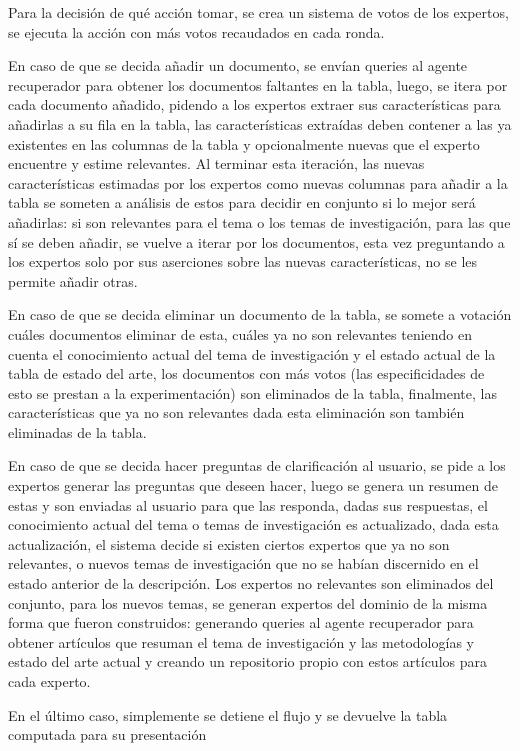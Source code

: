 \documentclass[12pt]{article}
\begin{document}
Para la decisión de qué acción tomar, se crea un sistema de votos de los expertos, se ejecuta la acción con más votos recaudados en cada ronda.

En caso de que se decida añadir un documento, se envían queries al agente recuperador para obtener los documentos faltantes en la tabla, luego, se itera por cada documento añadido, pidendo a los expertos extraer sus características para añadirlas a su fila en la tabla, las características extraídas deben contener a las ya existentes en las columnas de la tabla y opcionalmente nuevas que el experto encuentre y estime relevantes. Al terminar esta iteración, las nuevas características estimadas por los expertos como nuevas columnas para añadir a la tabla se someten a análisis de estos para decidir en conjunto si lo mejor será añadirlas: si son relevantes para el tema o los temas de investigación, para las que sí se deben añadir, se vuelve a iterar por los documentos, esta vez preguntando a los expertos solo por sus aserciones sobre las nuevas características, no se les permite añadir otras.

En caso de que se decida eliminar un documento de la tabla, se somete a votación cuáles documentos eliminar de esta, cuáles ya no son relevantes teniendo en cuenta el conocimiento actual del tema de investigación y el estado actual de la tabla de estado del arte, los documentos con más votos (las especificidades de esto se prestan a la experimentación) son eliminados de la tabla, finalmente, las características que ya no son relevantes dada esta eliminación son también eliminadas de la tabla.

En caso de que se decida hacer preguntas de clarificación al usuario, se pide a los expertos generar las preguntas que deseen hacer, luego se genera un resumen de estas y son enviadas al usuario para que las responda, dadas sus respuestas, el conocimiento actual del tema o temas de investigación es actualizado, dada esta actualización, el sistema decide si existen ciertos expertos que ya no son relevantes, o nuevos temas de investigación que no se habían discernido en el estado anterior de la descripción. Los expertos no relevantes son eliminados del conjunto, para los nuevos temas, se generan expertos del dominio de la misma forma que fueron construidos: generando queries al agente recuperador para obtener artículos que resuman el tema de investigación y las metodologías y estado del arte actual y creando un repositorio propio con estos artículos para cada experto.

En el último caso, simplemente se detiene el flujo y se devuelve la tabla computada para su presentación
\end{document}

